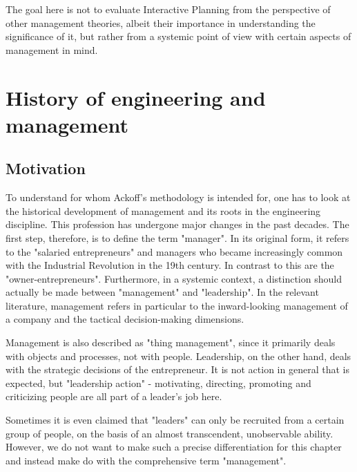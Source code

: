 \documentclass[a4paper,12pt]{scrartcl}
\begin{document}
The goal here is not to evaluate Interactive Planning from the perspective of other management theories, albeit their importance in understanding the significance of it, but rather from a systemic point of view with certain aspects of management in mind. 

\clearpage



\section{History of engineering and management}

\subsection{Motivation}
To understand for whom Ackoff's methodology is intended for, one has to look at the historical development of management and its roots in the engineering discipline. 
This profession has undergone major changes in the past decades. The first step, therefore, is to define the term "manager". In its original form, it refers to the "salaried entrepreneurs" and managers who became increasingly common with the Industrial Revolution in the 19th century. In contrast to this are the "owner-entrepreneurs". Furthermore, in a systemic context, a distinction should actually be made between "management" and "leadership". In the relevant literature, management refers in particular to the inward-looking management of a company and the tactical decision-making dimensions.\cite{kocka:1999} 

Management is also described as "thing management", since it primarily deals with objects and processes, not with people. Leadership, on the other hand, deals with the strategic decisions of the entrepreneur. It is not action in general that is expected, but "leadership action" - motivating, directing, promoting and criticizing people are all part of a leader's job here.\cite{niermann:2017} 

Sometimes it is even claimed that "leaders" can only be recruited from a certain group of people, on the basis of an almost transcendent, unobservable ability.\cite{boehmer:2014}
However, we do not want to make such a precise differentiation for this chapter and instead make do with the comprehensive term "management".
\end{document}
